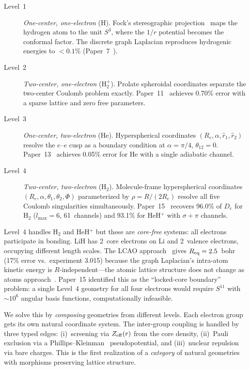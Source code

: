 \documentclass[aps,pra,twocolumn,superscriptaddress,longbibliography,floatfix]{revtex4-2}
\begin{document}
\begin{description}
\item[Level~1] \emph{One-center, one-electron} (H).
  Fock's stereographic projection~\cite{fock1935} maps the hydrogen atom
  to the unit $S^3$, where the $1/r$ potential becomes the conformal
  factor.  The discrete graph Laplacian reproduces hydrogenic energies
  to $< 0.1\%$ (Paper~7~\cite{paper7}).

\item[Level~2] \emph{Two-center, one-electron} (H$_2^+$).
  Prolate spheroidal coordinates separate the two-center Coulomb problem
  exactly.  Paper~11~\cite{paper11} achieves 0.70\% error with a sparse
  lattice and zero free parameters.

\item[Level~3] \emph{One-center, two-electron} (He).
  Hyperspherical coordinates $(R_e, \alpha, \hat{r}_1, \hat{r}_2)$
  resolve the $e$--$e$ cusp as a boundary condition at $\alpha=\pi/4$,
  $\theta_{12}=0$.  Paper~13~\cite{paper13} achieves 0.05\% error for
  He with a single adiabatic channel.

\item[Level~4] \emph{Two-center, two-electron} (H$_2$).
  Molecule-frame hyperspherical coordinates
  $(R_e, \alpha, \theta_1, \theta_2, \Phi)$ parameterized by
  $\rho = R/(2R_e)$ resolve all five Coulomb singularities simultaneously.
  Paper~15~\cite{paper15} recovers 96.0\% of $D_e$ for H$_2$
  ($l_{\max}=6$, 61~channels) and
  93.1\% for HeH$^+$ with $\sigma{+}\pi$ channels.
\end{description}

Level~4 handles H$_2$ and HeH$^+$ but these are \emph{core-free}
systems: all electrons participate in bonding.  LiH has 2~core
electrons on Li and 2~valence electrons, occupying different length
scales.  The LCAO approach~\cite{fci_m} gives $R_{\rm eq} = 2.5$~bohr
(17\% error vs.\ experiment 3.015) because the graph Laplacian's
intra-atom kinetic energy is $R$-independent---the atomic lattice
structure does not change as atoms approach~\cite{fci_m}.
Paper~15 identified this as the ``locked-core boundary'' problem:
a single Level~4 geometry for all four electrons would require $S^{11}$
with ${\sim}10^6$ angular basis functions, computationally infeasible.

We solve this by \emph{composing} geometries from different levels.
Each electron group gets its own natural coordinate system.
The inter-group coupling is handled by three typed edges:
(i)~screening via $Z_{\rm eff}(r)$ from the core density,
(ii)~Pauli exclusion via a Phillips--Kleinman~\cite{pk1959}
pseudopotential, and
(iii)~nuclear repulsion via bare charges.
This is the first realization of a \emph{category} of natural
geometries with morphisms preserving lattice structure.
\end{document}
